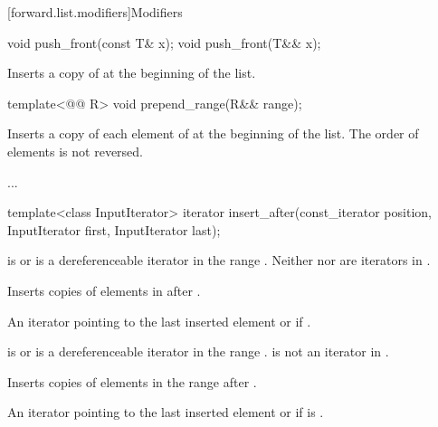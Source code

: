 \documentclass{wg21}
\begin{document}
[forward.list.modifiers]{Modifiers}

%
\begin{itemdecl}
    void push_front(const T& x);
    void push_front(T&& x);
\end{itemdecl}

\begin{itemdescr}
    \pnum
    \effects
    Inserts a copy of  at the beginning of the list.
\end{itemdescr}

\begin{addedblock}
\begin{itemdecl}
template<@@ R>
void prepend_range(R&& range);
\end{itemdecl}

\begin{itemdescr}
\pnum
\effects
Inserts a copy of each element of  at the beginning of the list. The order of elements is not reversed.
\end{itemdescr}
\end{addedblock}

...

\begin{itemdecl}
    template<class InputIterator>
    iterator insert_after(const_iterator position, InputIterator first, InputIterator last);
\end{itemdecl}

\begin{itemdescr}
    \pnum
    \expects
     is  or is a dereferenceable
    iterator in the range .
    Neither  nor  are iterators in .

    \pnum
    \effects
    Inserts copies of elements in  after .

    \pnum
    \returns
    An iterator pointing to the last inserted element or  if .
\end{itemdescr}

\begin{addedblock}
\begin{itemdecl}
template<@@ R>}
iterator insert_range_after(const_iterator position, R&& range);}
\end{itemdecl}

\begin{itemdescr}
    \pnum
    \expects
     is  or is a dereferenceable
    iterator in the range .
     is not an iterator in .

    \pnum
    \effects
    Inserts copies of elements in the range  after .

    \pnum
    \returns
    An iterator pointing to the last inserted element or  if  is .
\end{itemdescr}
\end{addedblock}
\end{document}
